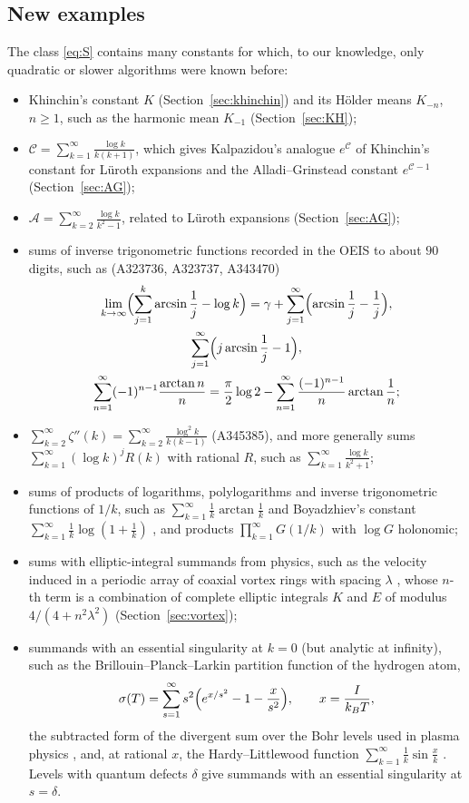 \documentclass[11pt]{amsart}
\theoremstyle{definition}
\theoremstyle{remark}
\begin{document}
\subsection{New examples}
The class \eqref{eq:S} contains many constants for which, to our knowledge, only quadratic or slower
algorithms were known before:
\begin{itemize}
\item Khinchin's constant $K$ (Section~\ref{sec:khinchin}) and its H\"older means $K_{-n}$, $n \ge 1$, such as the
harmonic mean $K_{-1}$ (Section~\ref{sec:KH});
\item $\mathcal C = \sum_{k=1}^{\infty}\frac{\log k}{k(k+1)}$, which gives Kalpazidou's analogue $e^{\mathcal C}$ of Khinchin's constant
for L\"uroth expansions and the Alladi--Grinstead constant $e^{\mathcal C - 1}$ (Section~\ref{sec:AG});
\item $\mathcal A = \sum_{k=2}^{\infty}\frac{\log k}{k^2-1}$, related to L\"uroth expansions (Section~\ref{sec:AG});
\item sums of inverse trigonometric functions recorded in the OEIS \cite{OEIS} to about $90$ digits, such as
(A323736, A323737, A343470)
\begin{gather*}
  \lim_{k\to\infty}\Bigl(\sum_{j=1}^{k}\arcsin\frac1j - \log k\Bigr)
    = \gamma + \sum_{j=1}^{\infty}\Bigl(\arcsin\frac1j - \frac1j\Bigr), \\
  \sum_{j=1}^{\infty}\Bigl(j\arcsin\frac1j - 1\Bigr), \\
  \sum_{n=1}^{\infty}(-1)^{n-1}\frac{\arctan n}{n} = \frac\pi2\log2 - \sum_{n=1}^{\infty}\frac{(-1)^{n-1}}{n}\arctan\frac1n;
\end{gather*}
\item $\sum_{k=2}^{\infty}\zeta''(k) = \sum_{k=2}^{\infty}\frac{\log^2 k}{k(k-1)}$ \cite[p.~538]{Fin18} (A345385), and more generally sums
$\sum_{k=1}^{\infty} (\log k)^j R(k)$ with rational $R$, such as $\sum_{k=1}^{\infty} \frac{\log k}{k^2+1}$;
\item sums of products of logarithms, polylogarithms and inverse trigonometric functions of $1/k$, such as
$\sum_{k=1}^{\infty} \frac1k\arctan\frac1k$ and Boyadzhiev's constant $\sum_{k=1}^{\infty}\frac1k\log(1+\frac1k)$ \cite{Boy19}, and products
$\prod_{k=1}^{\infty} G(1/k)$ with $\log G$ holonomic;
\item sums with elliptic-integral summands from physics, such as the velocity induced in a periodic array of
coaxial vortex rings with spacing $\lambda$ \cite{MS22}, whose $n$-th term is a combination of complete elliptic
integrals $K$ and $E$ of modulus $4/(4+n^2\lambda^2)$ (Section~\ref{sec:vortex});
\item summands with an essential singularity at $k = 0$ (but analytic at infinity), such as the
Brillouin--Planck--Larkin partition function of the hydrogen atom,
\[
  \sigma(T) = \sum_{s=1}^{\infty}s^2\Bigl(e^{x/s^2} - 1 - \frac{x}{s^2}\Bigr), \qquad x = \frac{I}{k_BT},
\]
the subtracted form of the divergent
sum over the Bohr levels used in plasma physics \cite{EKR11}, and, at rational $x$, the Hardy--Littlewood
function $\sum_{k=1}^{\infty}\frac1k\sin\frac xk$ \cite{Gau05}. Levels with quantum defects $\delta$ give summands
with an essential singularity at $s = \delta$.
\end{itemize}
\end{document}

